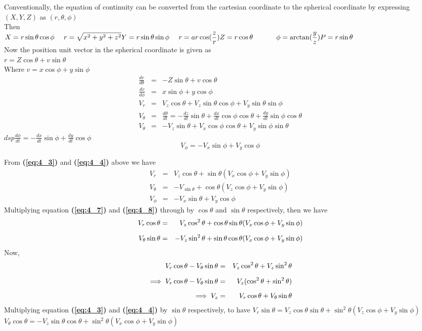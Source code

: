 \documentclass[12pt]{report}
\newcommand{\sps}{\\[0.2cm]}
\newcommand{\spn}[1]{\\[#1cm]}
\newcommand{\refn}[1]{\textbf{(\ref{#1})}}
\newcommand{\NI}{\noindent}
\newcommand{\dsp}{\displaystyle}
\begin{document}
	\NI Conventionally, the equation of continuity can be converted from the cartesian coordinate to the spherical coordinate by expressing $(X,Y,Z)$ as $(r, \theta, \phi)$\sps
	Then\sps
	$\dsp 
		X = r\sin\theta\cos\phi ~~~~ r = \sqrt{x^2 + y^2 + z^2}\sps
		Y = r\sin\theta\sin\phi ~~~~ r = ar\cos(\frac{z}{r})\sps
		Z = r\cos \theta \qquad\quad~ \phi = \arctan(\frac{y}{z})\sps
		P = r\sin \theta
	$\sps 
	Now the position unit vector in the spherical coordinate is given as \\
	$r = Z\cos\theta + v\sin\theta$\sps
	Where $v = x\cos\phi + y\sin\phi$
	\begin{eqnarray}
		\frac{dr}{d\theta} &=& -Z\sin\theta + v\cos\theta\label{eq:4_1}\spn{0.5}
		\frac{dv}{d\phi} &=& x\sin\phi + y\cos\phi\label{eq:4_2} \spn{0.5}
		V_r &=& V_z\cos\theta + V_z\sin\theta\cos\phi + V_y\sin\theta\sin\phi \label{eq:4_3}\spn{0.5}
		V_\theta &=& \frac{d\theta}{dt} = - \frac{dz}{dt}\sin\theta + \frac{dx}{dt}\cos\phi\cos\theta + \frac{dy}{dt}\sin\phi\cos\theta \label{eq:4_4} \spn{0.5}
		V_\theta &=& -V_z\sin\theta + V_x\cos\phi\cos\theta + V_y\sin\phi\sin\theta \label{eq:4_5}
	\end{eqnarray}
	$dsp \frac{d\phi}{dt} = -\frac{dx}{dt}\sin\phi + \frac{dy}{dt}\cos\phi$\spn{0.5}
	\begin{equation}
		V_\phi = -V_x\sin\phi + V_y\cos\phi \label{eq:4_6}
	\end{equation}
	
	\NI From \refn{eq:4_3} and \refn{eq:4_4} above we have
	\begin{eqnarray}
		V_r &=& V_z\cos\theta + \sin\theta(V_x\cos\phi + V_y\sin\phi) \label{eq:4_7} \spn{0.1}
		V_\theta &=& -V_{\sin\theta} + \cos\theta(V_z\cos\phi + V_y\sin\phi) \label{eq:4_8} \spn{0.1}
		V_\phi &=& -V_x\sin\theta + V_y\cos\phi \label{eq:4_9}
	\end{eqnarray}
	Multiplying equation \refn{eq:4_7} and \refn{eq:4_8} through by $\cos\theta$ and $\sin\theta$ respectively, then we have
	\begin{eqnarray}
		V_r\cos\theta &=& V_z\cos^2\theta + \cos\theta\sin\theta(V_x\cos\phi + V_y\sin\phi)\notag \sps
		V_\theta\sin\theta &=& -V_z\sin^2\theta + \sin\theta\cos\theta(V_x\cos\phi + V_y\sin\phi)\notag
	\end{eqnarray}
	Now,
	\begin{eqnarray}
		V_r\cos\theta - V_\theta\sin\theta &=& V_z\cos^2\theta + V_z\sin^2\theta \notag \sps
		\implies V_r\cos\theta - V_\theta\sin\theta &=&V_z(\cos^2\theta + \sin^2\theta)\notag \sps
		\implies V_z &=& V_r\cos\theta + V_\theta\sin\theta \notag
	\end{eqnarray}
	Multiplying equation \refn{eq:4_3} and \refn{eq:4_4} by $\sin\theta$ respectively, to have $V_r\sin\theta = V_z\cos\theta\sin\theta + \sin^2\theta(V_z\cos\phi + V_y\sin\phi)$\\
	$V_\theta\cos\theta = -V_z\sin\theta\cos\theta+\sin^2\theta(V_x\cos\phi + V_y\sin\phi)$\\
	
\end{document}
